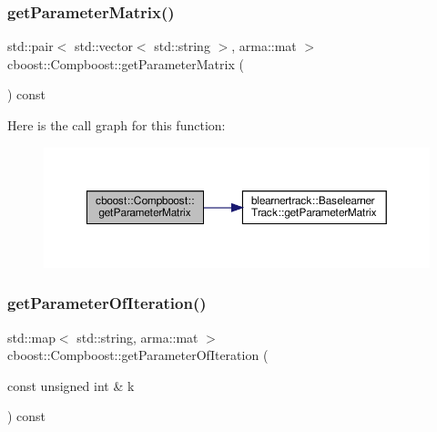 \subsubsection{\texorpdfstring{get\+Parameter\+Matrix()}{getParameterMatrix()}}
{\footnotesize\ttfamily std\+::pair$<$ std\+::vector$<$ std\+::string $>$, arma\+::mat $>$ cboost\+::\+Compboost\+::get\+Parameter\+Matrix (\begin{DoxyParamCaption}{ }\end{DoxyParamCaption}) const}

Here is the call graph for this function\+:\nopagebreak
\begin{figure}[H]
\begin{center}
\leavevmode
\includegraphics[width=350pt]{classcboost_1_1_compboost_a1652d7fa10039beaee1998e640f1b68a_cgraph}
\end{center}
\end{figure}
\mbox{\label{classcboost_1_1_compboost_a97b02aa81981e08658d896ff9798b5d0}} 
\subsubsection{\texorpdfstring{get\+Parameter\+Of\+Iteration()}{getParameterOfIteration()}}
{\footnotesize\ttfamily std\+::map$<$ std\+::string, arma\+::mat $>$ cboost\+::\+Compboost\+::get\+Parameter\+Of\+Iteration (\begin{DoxyParamCaption}\item[{const unsigned int \&}]{k }\end{DoxyParamCaption}) const}


